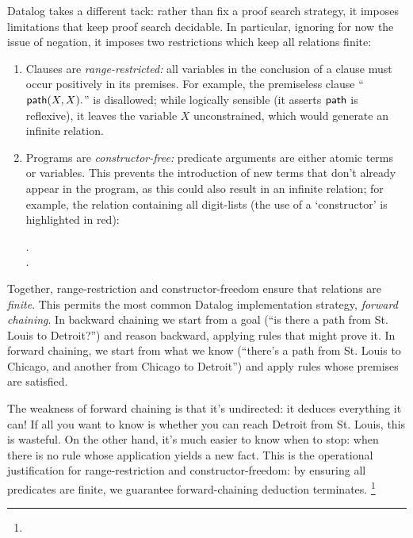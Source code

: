 Datalog takes a different tack: rather than fix a proof search strategy, it
imposes limitations that keep proof search decidable. In particular, ignoring
for now the issue of negation, it imposes two restrictions which keep all
 relations finite:

\begin{enumerate}
\item Clauses are \emph{range-restricted:} all variables in the conclusion of a
  clause must occur positively in its premises. For example, the premiseless
  clause ``$\text{\sffamily path}({X,X}).$'' is disallowed; while logically sensible (it
  asserts $\text{\sffamily path}$ is reflexive), it leaves the variable $X$ unconstrained,
  which would generate an infinite relation.

\item Programs are \emph{constructor-free:} predicate arguments are either
  atomic terms or variables. This prevents the introduction of new terms that
  don't already appear in the program, as this could also result in an infinite
  relation; for example, the relation containing all digit-lists (the use of a
  `constructor' is highlighted in {\color{Red}red}):

  \nopagebreak[3]
  \begin{datalog}
    .
    \\
     \gets
     \conj {}.
  \end{datalog}
\end{enumerate}

\noindent
Together, range-restriction and constructor-freedom ensure that relations are
\emph{finite}. This permits the most common Datalog implementation strategy,
\emph{forward chaining}.
%
In backward chaining we start from a goal (``is there a path from St.
Louis to Detroit?'') and reason backward, applying rules that might prove it.
%
In forward chaining, we start from what we know (``there's a path from
St. Louis to Chicago, and another from Chicago to Detroit'') and apply rules
whose premises are satisfied.

The weakness of forward chaining is that it's undirected: it deduces everything
it can! If all you want to know is whether you can reach Detroit from St. Louis,
this is wasteful. On the other hand, it's much easier to know when to stop: when
there is no rule whose application yields a new fact. This is the operational
justification for range-restriction and constructor-freedom: by ensuring all
predicates are finite, we guarantee forward-chaining deduction terminates.%
%
\footnote{}

